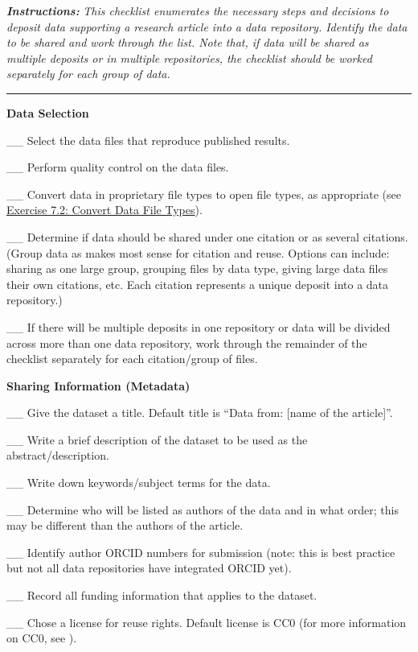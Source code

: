 \documentclass[
]{book}
\begin{document}
\textbf{\emph{Instructions:}} \emph{This checklist enumerates the necessary steps and decisions to deposit data supporting a research article into a data repository. Identify the data to be shared and work through the list. Note that, if data will be shared as multiple deposits or in multiple repositories, the checklist should be worked separately for each group of data.}

\begin{center}\rule{0.5\linewidth}{0.5pt}\end{center}

\textbf{Data Selection}

\_\_ Select the data files that reproduce published results.

\_\_ Perform quality control on the data files.

\_\_ Convert data in proprietary file types to open file types, as appropriate (see \protect\hyperlink{file-type}{Exercise 7.2: Convert Data File Types}).

\_\_ Determine if data should be shared under one citation or as several citations. (Group data as makes most sense for citation and reuse. Options can include: sharing as one large group, grouping files by data type, giving large data files their own citations, etc. Each citation represents a unique deposit into a data repository.)

\_\_ If there will be multiple deposits in one repository or data will be divided across more than one data repository, work through the remainder of the checklist separately for each citation/group of files.

\textbf{Sharing Information (Metadata)}

\_\_ Give the dataset a title. Default title is ``Data from: {[}name of the article{]}''.

\_\_ Write a brief description of the dataset to be used as the abstract/description.

\_\_ Write down keywords/subject terms for the data.

\_\_ Determine who will be listed as authors of the data and in what order; this may be different than the authors of the article.

\_\_ Identify author ORCID numbers for submission (note: this is best practice but not all data repositories have integrated ORCID yet).

\_\_ Record all funding information that applies to the dataset.

\_\_ Chose a license for reuse rights. Default license is CC0 (for more information on CC0, see \citep{creative_commons_wiki_cc0_2014}).
\end{document}
